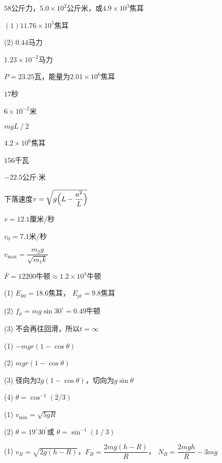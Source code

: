 \achapter

\answer $ 58 $公斤力，$ 5.0\times 10^2 $公斤米，或$ 4.9\times 10 ^3$焦耳

\answer $ (1) 11.76\times 1 0 ^ { 5 } $焦耳

(2) $ 0.44 $马力

\answer $ 1 . 2 3 \times 1 0 ^ { -2 }   $马力

\answer $ P = 2 3 . 2 5 $瓦，能量为$ 2.01\times 10 ^ 6 $焦耳

\answer $ 17 $秒

\answer $ 6 \times 1 0 ^ { - 2 } $米

\answer $ m g L \operatorname{/} 2 $

\answer $ 4 . 2 \times 1 0 ^ { 6 } $焦耳

\answer $ 156 $千瓦

\answer $ -22.5 $公斤$ \cdot $米

\addtocounter{answer}{2}
\answer 下落速度$v=\sqrt{g\Bigl(L-\dfrac{a^{2}}{L}\Bigr)}$

\answer $ v = 1 2 .  1 $厘米/秒


\answer $ v _ { 0 } = 7 . 1   $米/秒

\answer
$ v _ { \text{max} } = \dfrac { m _ { 2 } g } { \sqrt { m _ { 1 } k } } $

\answer $ \overline { F } = 1 2 2 0 0   $牛顿$ \approx 1.2\times 10 ^ 4 $牛顿

\answer (1) $ E _ { k 0 } = 1 8 .  6 $焦耳， $ E _ { pt } = 9 . 8   $焦耳

(2) $ f _ { \mu } = m g \sin 3 0 ^ { \circ } = 0 . 4 9   $牛顿

(3) 不会再往回滑，所以$ t = \infty $

\answer (1) $ - m g r \left( 1 - \cos \theta \right)  $

(2) $ m g r \left( 1 - \cos \theta \right) $

(3) 径向为$  2 g \left( 1 - \cos \theta \right)   $，切向为$  g \sin \theta  $

(4) $ \theta = \cos ^ { - 1 } \left( 2 / 3 \right) $

\answer (1) $ v _ { \text{min} } = \sqrt { 5 g R } $

(2) $ \theta = 1 9 ^ { \circ } 3 0 ^ { \prime }   $或 $ \theta = \sin ^ { - 1 } \left( 1 \operatorname{/} 3 \right)  $

\answer (1) $ v _ { B } = \sqrt { 2 g \left( h - R \right) }  $，$ F _ { B } = \dfrac { 2 m g \left( h - R \right) } {R} $，
$ N _ { B } = \dfrac { 2 m g h } { R } - 3 m g  $

